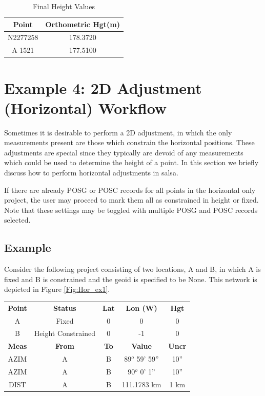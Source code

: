 \begin{table}[H]
\caption{Final Height Values}
\label{tab:FinalHeightValues}
\begin{center}
\begin{tabular}{|cc|}
	\hline
	\textbf{Point} &\textbf{Orthometric Hgt(m)}\\
	\hline
	N2277258 & 178.3720 \\
	A 1521 & 177.5100 \\
	\hline
\end{tabular}
\end{center}
\end{table}

\section{Example 4: 2D Adjustment (Horizontal) Workflow}

Sometimes it is desirable to perform a 2D adjustment, in which the only measurements present are those which constrain the horizontal positions.  These adjustments are special since they typically are devoid of any measurements which could be used to determine the height of a point.  In this section we briefly discuss how to perform horizontal adjustments in \textsf{salsa}.

If there are already POSG or POSC records for all points in the horizontal only project, the user may proceed to mark them all as constrained in height or fixed.  Note that these settings may be toggled with multiple POSG and POSC records selected. %

\subsection{Example}

Consider the following project consisting of two locations, A and B, in which A is fixed and B is constrained and the geoid is specified to be None.  This network is depicted in Figure \ref{Fig:Hor_ex1}.

\begin{table}
\centering
\begin{tabular}{|ccccc|}\hline
\textbf{Point}&\textbf{Status}&\textbf{Lat}&\textbf{Lon (W)}&\textbf{Hgt}\\
A&Fixed&0&0&0\\
B&Height Constrained&0&-1&0\\\hline
\textbf{Meas}&\textbf{From}&\textbf{To}&\textbf{Value}&\textbf{Uncr}\\
AZIM&A&B&89$^o$ 59' 59''&10''\\
AZIM&A&B&90$^o$  0'  1''&10''\\
DIST&A&B&111.1783 km&1 km\\\hline
\end{tabular}
\end{table}

